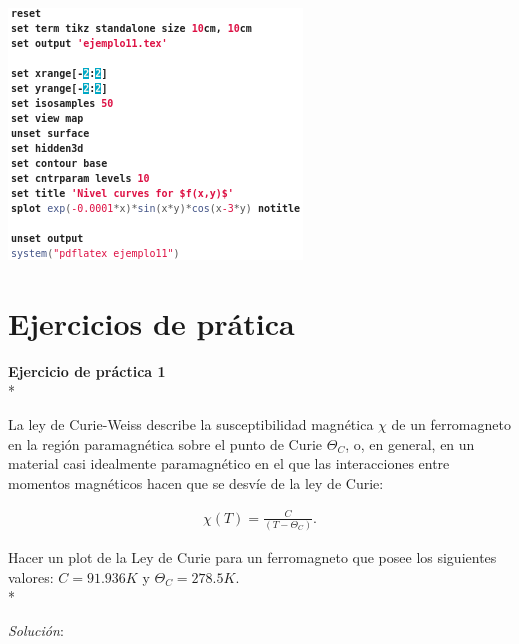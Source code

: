 \documentclass[11.5pt,a4paper]{article}
\begin{document}
\includegraphics[scale=0.6]{screen12.png}

\newpage
\section{Ejercicios de prática}

\textbf{Ejercicio de práctica 1}\\*

La ley de Curie-Weiss describe la susceptibilidad magnética $\chi$ de un ferromagneto en la región paramagnética sobre el punto de Curie $\Theta_{C}$, o, en general, en un material casi idealmente paramagnético en el que las interacciones entre momentos magnéticos hacen que se desvíe de la ley de Curie: 

\begin{eqnarray*}
\chi(T) = \frac{C}{(T-\Theta_{C})}.
\end{eqnarray*}

Hacer un plot de la Ley de Curie para un ferromagneto que posee los siguientes valores: $C = 91.936 K$ y $\Theta_{C} = 278.5 K$.\\*

\textit{Solución}:
\end{document}
